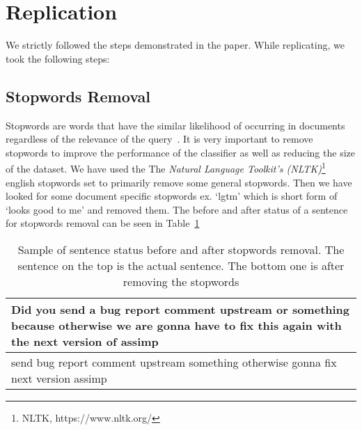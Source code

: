 \section{Replication}
\label{sect:replication}
We strictly followed the steps demonstrated in the paper. While replicating, we took the following steps:

\subsection{Stopwords Removal}
Stopwords are words that have the similar likelihood of occurring in documents regardless of the relevance of the query~\cite{Wilbur1992}. It is very important to remove stopwords to improve the performance of the classifier as well as reducing the size of the dataset. We have used the The \emph{Natural Language Toolkit's (NLTK)}\footnote{NLTK, https://www.nltk.org/}~\cite{Loper2002} english stopwords set to primarily remove some general stopwords. Then we have looked for some document specific stopwords ex. `lgtm' which is short form of `looks good to me' and removed them. The before and after status of a sentence for stopwords removal can be seen in Table~\ref{tbl:stopwords_removal}
  \begin{table}
  	\caption{Sample of sentence status before and after stopwords removal. The sentence on the top is the actual sentence. The bottom one is after removing the stopwords  }
  	\begin{tabular}{ p{3.25in}}
	 	\toprule
	  		Did you send a bug report comment upstream or something because otherwise we are gonna have to fix this again with the next version of assimp \\
  		\midrule
	  		send bug report comment upstream something otherwise gonna fix next version assimp \\
  		\bottomrule

  	\end{tabular}
  	\label{tbl:stopwords_removal}
  \end{table}   


